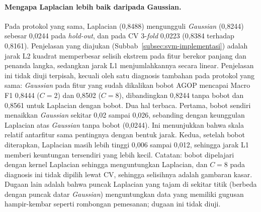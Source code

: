 \paragraph{Mengapa Laplacian lebih baik daripada Gaussian.} Pada protokol yang sama, Laplacian (0,8488) mengungguli \textit{Gaussian} (0,8244) sebesar 0,0244 pada \textit{hold-out}, dan pada CV 3-\textit{fold} 0,0223 (0,8384 terhadap 0,8161). Penjelasan yang diajukan (Subbab~\ref{subsec:svm-implementasi}) adalah jarak L2 kuadrat memperbesar selisih ekstrem pada fitur berekor panjang dan penanda langka, sedangkan jarak L1 menjumlahkannya secara linear. Penjelasan ini tidak diuji terpisah, kecuali oleh satu diagnosis tambahan pada protokol yang sama: \textit{Gaussian} pada fitur yang sudah dikalikan bobot AGOP mencapai Macro F1 0,8444 ($C = 2$) dan 0,8502 ($C = 8$), dibandingkan 0,8244 tanpa bobot dan 0,8561 untuk Laplacian dengan bobot. Dua hal terbaca. Pertama, bobot sendiri menaikkan \textit{Gaussian} sekitar 0,02 sampai 0,026, sebanding dengan keunggulan Laplacian atas \textit{Gaussian} tanpa bobot (0,0244). Ini menunjukkan bahwa skala relatif antarfitur sama pentingnya dengan bentuk jarak. Kedua, setelah bobot diterapkan, Laplacian masih lebih tinggi 0,006 sampai 0,012, sehingga jarak L1 memberi keuntungan tersendiri yang lebih kecil. Catatan: bobot dipelajari dengan kernel Laplacian sehingga menguntungkan Laplacian, dan $C = 8$ pada diagnosis ini tidak dipilih lewat CV, sehingga selisihnya adalah gambaran kasar. Dugaan lain adalah bahwa puncak Laplacian yang tajam di sekitar titik (berbeda dengan puncak datar \textit{Gaussian}) menguntungkan data yang memiliki gugusan hampir-kembar seperti rombongan pemesanan; dugaan ini tidak diuji.

